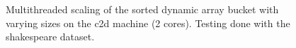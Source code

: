 \begin{landscape}
\begin{figure}[!h]
{        }
        \label{fig:ts_c2d_shake_sorted}
        \caption{Multithreaded scaling of the sorted dynamic array bucket with varying sizes on the
        c2d machine (2 cores). Testing done with the shakespeare dataset.}
    \end{figure}
    \begin{figure}[!h]
\end{figure}
\end{landscape}
